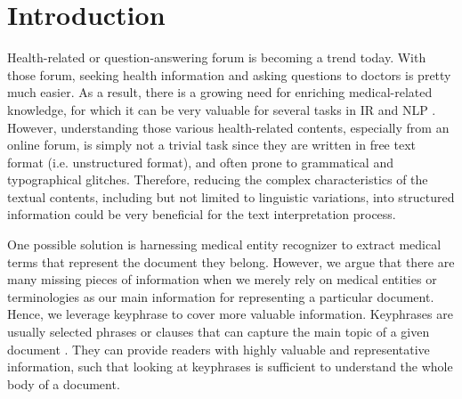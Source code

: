 \documentclass[sigconf]{acmart}
\begin{document}
\section{Introduction}
Health-related or question-answering forum is becoming a trend today. With those forum, seeking health information and asking questions to doctors is pretty much easier. As a result, there is a growing need for enriching medical-related knowledge, for which it can be very valuable for several tasks in IR and NLP \cite{cao2010automatically}. However, understanding those various health-related contents, especially from an online forum, is simply not a trivial task since they are written in free text format (i.e. unstructured format), and often prone to grammatical and typographical glitches. Therefore, reducing the complex characteristics of the textual contents, including but not limited to linguistic variations, into structured information could be very beneficial for the text interpretation process. 

One possible solution is harnessing medical entity recognizer to extract medical terms that represent the document they belong. However, we argue that there are many missing pieces of information when we merely rely on medical entities or terminologies as our main information for representing a particular document. Hence, we leverage keyphrase to cover more valuable information. Keyphrases are usually selected phrases or clauses that can capture the main topic of a given document \cite{turney2000learning}. They can provide readers with highly valuable and representative information, such that looking at keyphrases is sufficient to understand the whole body of a document.
\end{document}
